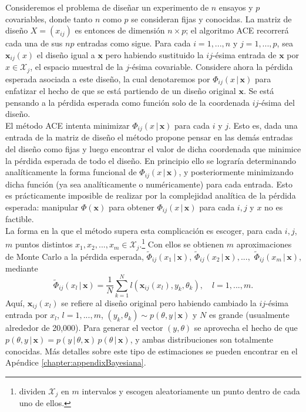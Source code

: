 Consideremos el problema de diseñar un experimento de $n$ ensayos y $p$ covariables, donde tanto $n$ como $p$ se consideran fijas y conocidas. La matriz de diseño $X = (x_{ij})$ es entonces de dimensión $n \times p$; el algoritmo ACE recorrerá cada una de sus $np$ entradas como sigue. Para cada $i=1,...,n$ y $j=1,...,p$, sea $\mathbf{x}_{ij}(x)$ el diseño igual a $\mathbf{x}$ pero habiendo sustituido la $ij$-ésima entrada de $\mathbf{x}$ por $x \in \mathcal{X}_j$, el espacio muestral de la $j$-ésima covariable. Considere ahora la pérdida esperada asociada a este diseño, la cual denotaremos por $\Phi_{ij}(x \, | \, \mathbf{x} )$ para enfatizar el hecho de que se está partiendo de un diseño original $\mathbf{x}$. Se está pensando a la pérdida esperada como función solo de la coordenada $ij$-ésima del diseño. \\



El método ACE intenta minimizar $\Phi_{ij}(x \, | \, \mathbf{x} )$ para cada $i$ y $j$. Esto es, dada una entrada de la matriz de diseño el método propone pensar en las demás entradas del diseño como fijas y luego encontrar el valor de dicha coordenada que minimice la pérdida esperada de todo el diseño. En principio ello se lograría determinando analíticamente la forma funcional de $\Phi_{ij}(x \, | \, \mathbf{x} )$, y posteriormente minimizando dicha función (ya sea analíticamente o numéricamente) para cada entrada. Esto es prácticamente imposible de realizar por la  complejidad analítica de la pérdida esperada: manipular $\Phi(\mathbf{x})$ para obtener $\Phi_{ij}(x \, | \, \mathbf{x} )$ para cada $i,j$ y $x$ no es factible. \\


La forma en la que el método supera esta complicación es escoger, para cada $i,j$, $m$ puntos distintos $x_1, x_2, ..., x_m \in \mathcal{X}_j$.\footnote{\cite{Woods_ACE} dividen $\mathcal{X}_j$ en $m$ intervalos y escogen aleatoriamente un punto dentro de cada uno de ellos.} Con ellos se obtienen $m$ aproximaciones de Monte Carlo a la pérdida esperada, $\tilde{\Phi}_{ij}( x_1 \, | \, \mathbf{x} )$, $\tilde{\Phi}_{ij}( x_2 \, | \, \mathbf{x} ), ...,$ $\tilde{\Phi}_{ij}( x_m \, | \, \mathbf{x} )$, mediante
\begin{equation} \label{eq:MonteCarloApprox}
	\tilde{\Phi}_{ij}(x_l \, | \, \mathbf{x} ) = \frac{1}{N} \sum_{k=1}^{N} l(\mathbf{x}_{ij}(x_l), y_k, \theta_k), \quad l=1,...,m.
\end{equation}
Aquí, $\mathbf{x}_{ij}(x_l)$ se refiere al diseño original pero habiendo cambiado la $ij$-ésima entrada por $x_l$, $l=1, ..., m$, $(y_k, \theta_k) \sim p( \theta, y \, | \, \mathbf{x})$ y $N$ es grande (usualmente alrededor de 20,000). Para generar el vector $(y, \theta)$ se aprovecha el hecho de que $p( \theta, y \, | \, \mathbf{x}) = p( y \, | \, \theta, \mathbf{x}) \, p(\theta \, | \, \mathbf{x})$, y ambas distribuciones son totalmente conocidas. Más detalles sobre este tipo de estimaciones se pueden encontrar en el Apéndice \ref{chapter:appendixBayesiana}.  \\ 


